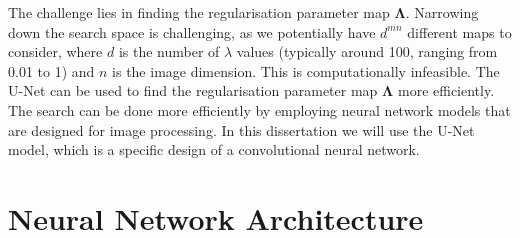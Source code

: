 \documentclass[12pt]{article}
\begin{document}












The challenge lies in finding the regularisation parameter map $\mathbf{\Lambda}$.  
Narrowing down the search space is challenging, as we potentially have $d^{m n}$ different maps to consider, where $d$ is the number of $\lambda$ values (typically around 100, ranging from 0.01 to 1) and $n$ is the image dimension. This is computationally infeasible. The U-Net can be used to find the 
regularisation parameter map $\mathbf{\Lambda}$
more efficiently.
The search can be done more efficiently by employing neural network models that are designed for image processing. 
In this dissertation we will use the U-Net model, which is a specific design of a convolutional neural network.




\section{Neural Network Architecture}


\end{document}

